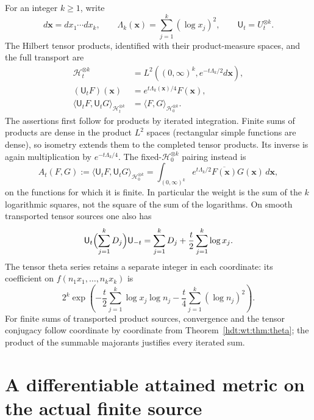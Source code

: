 For an integer $k\geq1$, write
\[
 d\mathbf x=dx_1\cdots dx_k,\qquad
 \Lambda_k(\mathbf x)=\sum_{j=1}^k(\log x_j)^2,\qquad
 \mathsf U_t=U_t^{\otimes k}.
\]
The Hilbert tensor products, identified with their product-measure
spaces, and the full transport are
\begin{equation}\label{hdt:wt:eq:tensor}
 \begin{split}
 \mathcal H_t^{\otimes k}
 &=L^2((0,\infty)^k,e^{-t\Lambda_k/2}d\mathbf x),\\
 (\mathsf U_tF)(\mathbf x)&=e^{t\Lambda_k(\mathbf x)/4}F(\mathbf x),\\
 \langle\mathsf U_tF,\mathsf U_tG\rangle_{\mathcal H_t^{\otimes k}}
 &=\langle F,G\rangle_{\mathcal H_0^{\otimes k}}.
 \end{split}
\end{equation}
The assertions first follow for products by iterated integration.
Finite sums of products are dense in the product $L^2$ spaces
(rectangular simple functions are dense), so isometry extends
them to the completed tensor products.  Its inverse is again
multiplication by $e^{-t\Lambda_k/4}$.
The fixed-$\mathcal H_0^{\otimes k}$ pairing instead is
\begin{equation}\label{hdt:wt:eq:fixed-form}
 A_t(F,G):=\langle\mathsf U_tF,\mathsf U_tG\rangle_{\mathcal H_0^{\otimes k}}
 =\int_{(0,\infty)^k}e^{t\Lambda_k/2}\overline{F(\mathbf x)}
 G(\mathbf x)\,d\mathbf x,
\end{equation}
on the functions for which it is finite.  In particular the
weight is the sum of the $k$ logarithmic squares, not the square
of the sum of the logarithms.
On smooth transported tensor sources one also has
\[
 \mathsf U_t\Bigl(\sum_{j=1}^kD_j\Bigr)\mathsf U_{-t}
 =\sum_{j=1}^kD_j+\frac t2\sum_{j=1}^k\log x_j.
\]
The tensor theta series retains a separate integer in each
coordinate: its coefficient on $f(n_1x_1,\ldots,n_kx_k)$ is
\[
 2^k\exp\!\left(-\frac t2\sum_{j=1}^k\log x_j\log n_j
                 -\frac t4\sum_{j=1}^k(\log n_j)^2\right).
\]
For finite sums of transported product sources, convergence and
the tensor conjugacy follow coordinate by coordinate from
Theorem~\ref{hdt:wt:thm:theta}; the product of the summable majorants
justifies every iterated sum.

\section{A differentiable attained metric on the actual finite source}
\label{hdt:wt:sec:metric}

